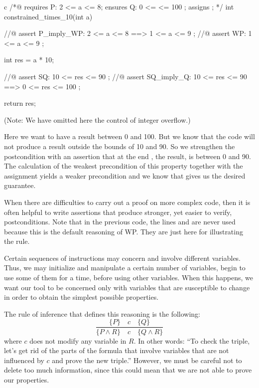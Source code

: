 \begin{CodeBlock}{c}
/*@
  requires P: 2 <= a <= 8;
  ensures  Q: 0 <= \result <= 100 ;
  assigns  \nothing ;
*/
int constrained_times_10(int a){
  //@ assert P_imply_WP: 2 <= a <= 8 ==> 1 <= a <= 9 ;
  //@ assert WP:         1 <= a <= 9 ;

  int res = a * 10;

  //@ assert SQ:         10 <= res <= 90 ;
  //@ assert SQ_imply_Q: 10 <= res <= 90 ==> 0 <= res <= 100 ;

  return res;
}
\end{CodeBlock}



(Note: We have omitted here the control of integer overflow.)



Here we want to have a result between 0 and 100. But we know that the
code will not produce a result outside the bounds of 10 and 90. So we
strengthen the postcondition with an assertion that at the end
, the result, is between 0 and 90. The calculation of the
weakest precondition of this property together with the assignment
 yields a weaker precondition
 and we know that
 gives us the desired
guarantee.



When there are difficulties to carry out a proof on more complex code,
then it is often helpful to write assertions that produce stronger, yet
easier to verify, postconditions. Note that in the previous code, the
lines  and are never used
because this is the default reasoning of WP. They are just here for
illustrating the rule.


\label{l3:statements-basic-constancy}


Certain sequences of instructions may concern and involve different
variables. Thus, we may initialize and manipulate a certain number of
variables, begin to use some of them for a time, before using other
variables. When this happens, we want our tool to be concerned only with
variables that are susceptible to change in order to obtain the simplest
possible properties.



The rule of inference that defines this reasoning is the following:
$$\dfrac{\{P\}\quad c\quad \{Q\}}{\{P \wedge R\}\quad c\quad \{Q \wedge R\}}$$
where $c$ does not modify any variable in $R$. In other words:
``To check the triple, let's get rid of the parts of the formula that
involve variables that are not influenced by $c$ and prove the new
triple.'' However, we must be careful not to delete too much
information, since this could mean that we are not able to prove our
properties.


